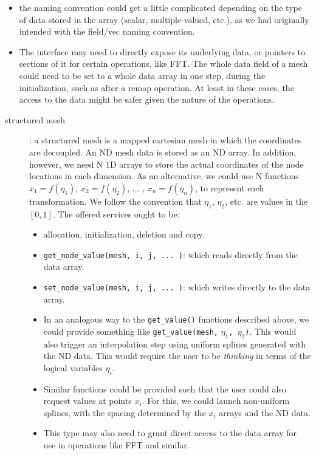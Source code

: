 \documentclass[]{report}   %
\begin{document}
\begin{itemize}
\item the naming convention could get a little complicated depending on the type of data stored in the array (scalar, multiple-valued, etc.), as we had originally intended with the field/vec naming convention.
\item The interface may need to directly expose its underlying data, or pointers to sections of it for certain operations, like FFT. The whole data field of a mesh could need to be set to a whole data array in one step, during the initialization, such as after a remap operation. At least in these cases, the access to the data might be safer given the nature of the operations.
\end{itemize}

\begin{description}
\item[structured mesh]: a structured mesh is a mapped cartesian mesh in which the coordinates are decoupled. An ND mesh data is stored as an ND array. In addition, however, we need N 1D arrays to store the actual coordinates of the node locations in each dimension. As an alternative, we could use N functions $x_1=f(\eta_1)$, $x_2=f(\eta_2)$, ... , $x_n=f(\eta_n)$, to represent each transformation. We follow the convention that $\eta_1$, $\eta_2$, etc.  are values in the $[0,1]$. The offered services ought to be:

\begin{itemize}
\item allocation, initialization, deletion and copy.
\item \verb+get_node_value(mesh, i, j, ... )+: which reads directly from the data array.
\item \verb+set_node_value(mesh, i, j, ... )+: which writes directly to the data array.
\item In an analogous way to the \verb+get_value()+ functions described above, we could provide something like \verb+get_value(mesh,+ $\eta_1$\verb+, +$\eta_2$\verb+)+. This would also trigger an interpolation step using uniform splines generated with the ND data. This would require the user to be \emph{thinking} in terms of the logical variables $\eta_i$. 
\item Similar functions could be provided such that the user could also request values at points $x_i$. For this, we could launch non-uniform splines, with the spacing determined by the $x_i$ arrays and the ND data.
\item This type may also need to grant direct access to the data array for use in operations like FFT and similar.
\end{itemize}


\end{description}
\end{document}
